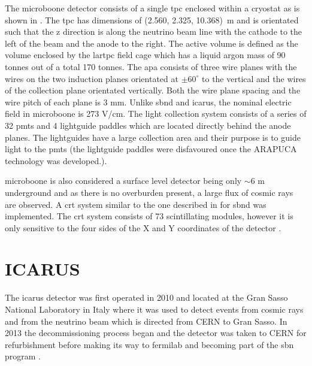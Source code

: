 The \gls{microboone} detector consists of a single \gls{tpc} enclosed within a cryostat as is shown in . The \gls{tpc} has dimensions of (2.560, 2.325, 10.368)~m and is orientated such that the z direction is along the neutrino beam line with the cathode to the left of the beam and the anode to the right. The active volume is defined as the volume enclosed by the \gls{lartpc} field cage which has a liquid argon mass of 90 tonnes out of a total 170 tonnes. The \gls{apa} consists of three wire planes with the wires on the two induction planes orientated at $\pm 60^{\circ}$ to the vertical and the wires of the collection plane orientated vertically. Both the wire plane spacing and the wire pitch of each plane is 3 mm. Unlike \gls{sbnd} and \gls{icarus}, the nominal electric field in \gls{microboone} is 273 V/cm. The light collection system consists of a series of 32 \glspl{pmt} and 4 lightguide paddles which are located directly behind the anode planes. The lightguides have a large collection area and their purpose is to guide light to the \glspl{pmt} (the lightguide paddles were disfavoured once the ARAPUCA technology was developed.)\cite{microboone_detector}.

\gls{microboone} is also considered a surface level detector being only $\sim 6$ m underground and as there is no overburden present, a large flux of cosmic rays are observed. A \gls{crt} system similar to the one described in  for \gls{sbnd} was implemented. The \gls{crt} system consists of 73 scintillating modules, however it is only sensitive to the four sides of the X and Y coordinates of the detector \cite{microboone_crt}. 


\section{ICARUS}\label{sec:ICARUS}

The \gls{icarus} detector was first operated in 2010 and  located at the Gran Sasso National Laboratory in Italy where it was used to detect events from cosmic rays and from the neutrino beam which is directed from CERN to Gran Sasso. In 2013 the decommissioning process began and the detector was taken to CERN for refurbishment before making its way to \gls{fermilab} and becoming part of the \gls{sbn} program \cite{SBN_Proposal}.

